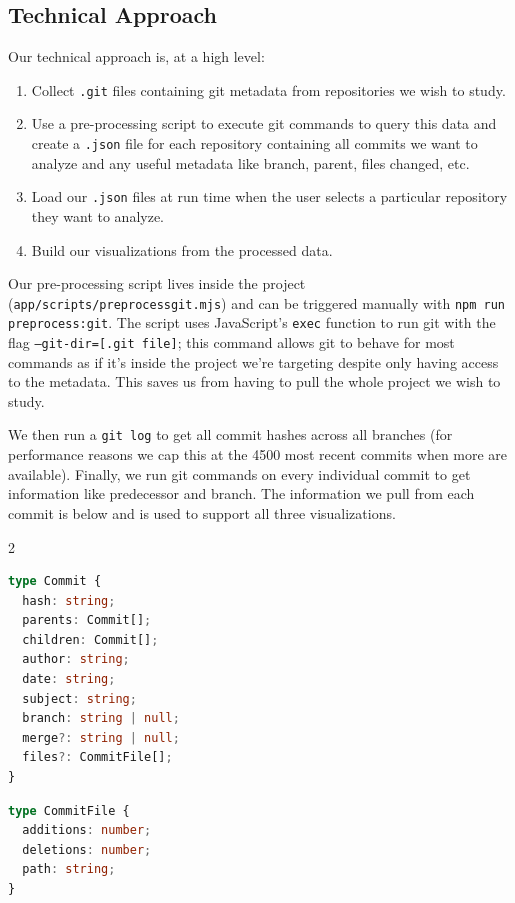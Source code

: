 \documentclass[12 pt]{article}
\begin{document}
\subsection{Technical Approach}
Our technical approach is, at a high level:
\begin{enumerate}
    \item Collect \texttt{.git} files containing git metadata from repositories we wish to
        study.
    \item Use a pre-processing script to execute git commands to query this data
        and create a \texttt{.json} file for each repository containing all commits we
        want to analyze and any useful metadata like branch, parent, files
        changed, etc.
    \item Load our \texttt{.json} files at run time when the user selects a
        particular repository they want to analyze.
    \item Build our visualizations from the processed data.
\end{enumerate}
Our pre-processing script lives inside the project
(\texttt{app/scripts/preprocessgit.mjs}) and can be triggered manually
with \texttt{npm run preprocess:git}. The script uses JavaScript's \texttt{exec}
function to run git with the flag \texttt{--git-dir=[.git file]}; this command
allows git to behave for most commands as if it's inside the project we're
targeting despite only having access to the metadata. This saves us from having to
pull the whole project we wish to study. \par
We then run a \texttt{git log} to get all commit hashes across all branches (for
performance reasons we cap this at the 4500 most recent commits when more are
available). Finally, we run git commands on every individual commit to get
information like predecessor and branch. The information we pull from each
commit is below and is used to support all three visualizations. \par

\noindent\begin{minipage}{\linewidth}
\begin{multicols}{2}
\begin{lstlisting}[language=TypeScript]
type Commit {
  hash: string;
  parents: Commit[];
  children: Commit[];
  author: string;
  date: string;
  subject: string;
  branch: string | null;
  merge?: string | null;
  files?: CommitFile[];
}
\end{lstlisting}
\columnbreak
\begin{lstlisting}[language=TypeScript]
type CommitFile {
  additions: number;
  deletions: number;
  path: string;
}
\end{lstlisting}
\end{multicols}
\end{minipage}
\\
\\
\end{document}
